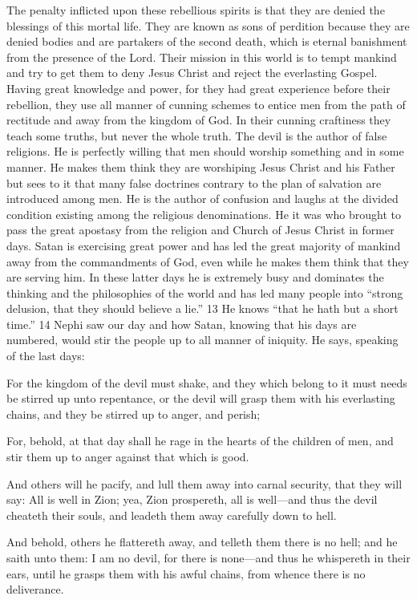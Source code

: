 The penalty inflicted upon these rebellious spirits is that they are denied the blessings of this
mortal life. They are known as sons of perdition because they are denied bodies and are
partakers of the second death, which is eternal banishment from the presence of the Lord.
Their mission in this world is to tempt mankind and try to get them to deny Jesus Christ and
reject the everlasting Gospel. Having great knowledge and power, for they had great
experience before their rebellion, they use all manner of cunning schemes to entice men from
the path of rectitude and away from the kingdom of God. In their cunning craftiness they
teach some truths, but never the whole truth. The devil is the author of false religions. He is
perfectly willing that men should worship something and in some manner. He makes them
think they are worshiping Jesus Christ and his Father but sees to it that many false doctrines
contrary to the plan of salvation are introduced among men. He is the author of confusion
and laughs at the divided condition existing among the religious denominations. He it was
who brought to pass the great apostasy from the religion and Church of Jesus Christ in
former days. Satan is exercising great power and has led the great majority of mankind away
from the commandments of God, even while he makes them think that they are serving him.
In these latter days he is extremely busy and dominates the thinking and the philosophies of
the world and has led many people into ``strong delusion, that they should believe a lie.'' 13
He knows ``that he hath but a short time.'' 14 Nephi saw our day and how Satan, knowing that
his days are numbered, would stir the people up to all manner of iniquity. He says, speaking
of the last days:

For the kingdom of the devil must shake, and they which belong to it must needs be stirred
up unto repentance, or the devil will grasp them with his everlasting chains, and they be
stirred up to anger, and perish;

For, behold, at that day shall he rage in the hearts of the children of men, and stir them up to
anger against that which is good.

And others will he pacify, and lull them away into carnal security, that they will say: All is
well in Zion; yea, Zion prospereth, all is well—and thus the devil cheateth their souls, and
leadeth them away carefully down to hell.

And behold, others he flattereth away, and telleth them there is no hell; and he saith unto
them: I am no devil, for there is none—and thus he whispereth in their ears, until he grasps
them with his awful chains, from whence there is no deliverance.


